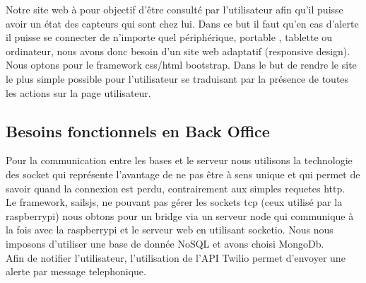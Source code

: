 Notre site web à pour objectif d’être consulté par l'utilisateur afin qu'il puisse avoir un état des capteurs qui sont chez lui. Dans ce but il faut qu'en cas d’alerte il puisse se connecter de n'importe quel périphérique, portable , tablette ou ordinateur, nous avons donc besoin d'un site web adaptatif (responsive design).\\
Nous optons pour le framework css/html bootstrap. Dans le but de rendre le site le plus simple possible pour l’utilisateur se traduisant par la présence de toutes les actions sur la page utilisateur.\\

\subsection{Besoins fonctionnels en Back Office}
Pour la communication entre les bases et le serveur nous utilisons la technologie des socket qui représente l’avantage de ne pas être à sens unique et qui permet de savoir quand la connexion est perdu, contrairement aux simples requetes http.\\
Le framework, sailsjs, ne pouvant pas gérer les sockets tcp (ceux utilisé par la raspberrypi) nous obtons pour un bridge via un serveur node qui communique à la fois avec la raspberrypi et le serveur web en utilisant socketio. Nous nous imposons d’utiliser une base de donnée NoSQL et avons choisi MongoDb.\\

Afin de notifier l'utilisateur, l'utilisation de l’API Twilio permet d'envoyer une alerte par message telephonique.\\